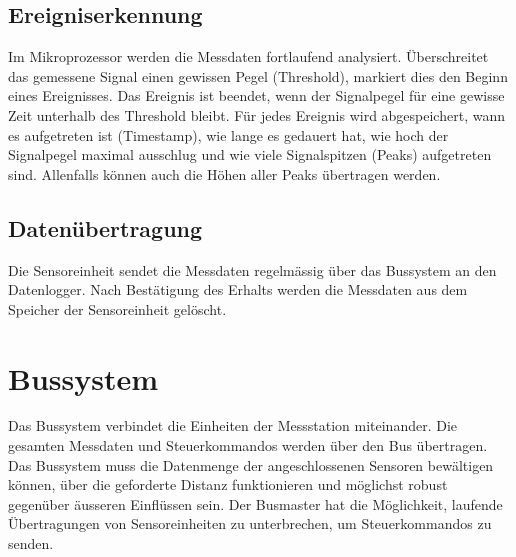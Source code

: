 \subsection{Ereigniserkennung}
Im Mikroprozessor werden die Messdaten fortlaufend analysiert. Überschreitet das gemessene Signal einen gewissen Pegel (Threshold), markiert dies den Beginn eines Ereignisses. Das Ereignis ist beendet, wenn der Signalpegel für eine gewisse Zeit unterhalb des Threshold bleibt. Für jedes Ereignis wird abgespeichert, wann es aufgetreten ist (Timestamp), wie lange es gedauert hat, wie hoch der Signalpegel maximal ausschlug und wie viele Signalspitzen (Peaks) aufgetreten sind. Allenfalls können auch die Höhen aller Peaks übertragen werden.

\subsection{Datenübertragung}
Die Sensoreinheit sendet die Messdaten regelmässig über das Bussystem an den Datenlogger. Nach Bestätigung des Erhalts werden die Messdaten aus dem Speicher der Sensoreinheit gelöscht.

\section{Bussystem}
Das Bussystem verbindet die Einheiten der Messstation miteinander. Die gesamten Messdaten und Steuerkommandos werden über den Bus übertragen. Das Bussystem muss die Datenmenge der angeschlossenen Sensoren bewältigen können, über die geforderte Distanz funktionieren und möglichst robust gegenüber äusseren Einflüssen sein. Der Busmaster hat die Möglichkeit, laufende Übertragungen von Sensoreinheiten zu unterbrechen, um Steuerkommandos zu senden.